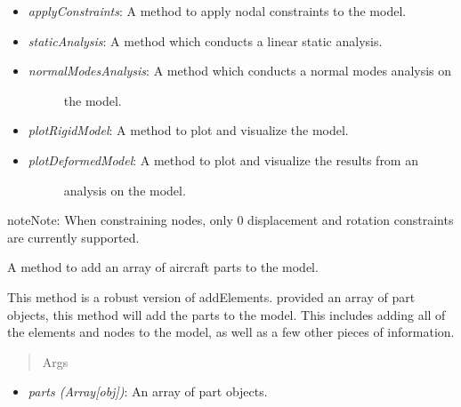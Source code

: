 \documentclass[letterpaper,10pt,english]{sphinxmanual}
\begin{document}
\begin{fulllineitems}
\begin{itemize}
\begin{description}
\end{description}

\item {} 
\emph{applyConstraints}: A method to apply nodal constraints to the model.

\item {} 
\emph{staticAnalysis}: A method which conducts a linear static analysis.

\item {} \begin{description}
\item[{\emph{normalModesAnalysis}: A method which conducts a normal modes analysis on}] \leavevmode
the model.

\end{description}

\item {} 
\emph{plotRigidModel}: A method to plot and visualize the model.

\item {} \begin{description}
\item[{\emph{plotDeformedModel}: A method to plot and visualize the results from an}] \leavevmode
analysis on the model.

\end{description}

\end{itemize}

\begin{notice}{note}{Note:}
When constraining nodes, only 0 displacement and rotation
constraints are currently supported.
\end{notice}

\begin{fulllineitems}
\label{FEM:AeroComBAT.FEM.Model.addAircraftParts}
A method to add an array of aircraft parts to the model.

This method is a robust version of addElements. provided an array of
part objects, this method will add the parts to the model. This
includes adding all of the elements and nodes to the model, as well as
a few other pieces of information.
\begin{quote}\begin{description}
\item[{Args}] \leavevmode
\end{description}\end{quote}
\begin{itemize}
\item {} 
\emph{parts (Array{[}obj{]})}: An array of part objects.


\end{itemize}
\end{fulllineitems}
\end{fulllineitems}
\end{document}

